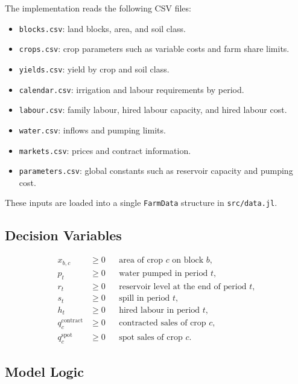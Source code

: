 The implementation reads the following CSV files:

\begin{itemize}[leftmargin=1.5em]
    \item \texttt{blocks.csv}: land blocks, area, and soil class.
    \item \texttt{crops.csv}: crop parameters such as variable costs and farm share limits.
    \item \texttt{yields.csv}: yield by crop and soil class.
    \item \texttt{calendar.csv}: irrigation and labour requirements by period.
    \item \texttt{labour.csv}: family labour, hired labour capacity, and hired labour cost.
    \item \texttt{water.csv}: inflows and pumping limits.
    \item \texttt{markets.csv}: prices and contract information.
    \item \texttt{parameters.csv}: global constants such as reservoir capacity and pumping cost.
\end{itemize}

These inputs are loaded into a single \texttt{FarmData} structure in \texttt{src/data.jl}.

\subsection{Decision Variables}

\begin{align*}
    x_{b,c} &\ge 0 && \text{area of crop } c \text{ on block } b, \\
    p_t &\ge 0 && \text{water pumped in period } t, \\
    r_t &\ge 0 && \text{reservoir level at the end of period } t, \\
    s_t &\ge 0 && \text{spill in period } t, \\
    h_t &\ge 0 && \text{hired labour in period } t, \\
    q^{\text{contract}}_c &\ge 0 && \text{contracted sales of crop } c, \\
    q^{\text{spot}}_c &\ge 0 && \text{spot sales of crop } c.
\end{align*}

\subsection{Model Logic}

